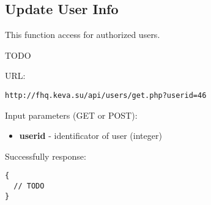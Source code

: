 \subsection{Update User Info}
\par

This function access for authorized users.

TODO

URL:
\begin{Verbatim}[frame=single]
http://fhq.keva.su/api/users/get.php?userid=46
\end{Verbatim}

Input parameters (GET or POST):
\begin{itemize}
  \item \textbf{userid} - identificator of user (integer)
\end{itemize}

Successfully response:  \\
\begin{Verbatim}[frame=single]
{
  // TODO
}
\end{Verbatim}

~

